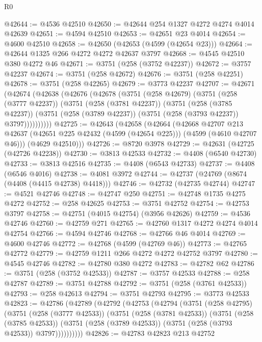 \begin{lexlean}{R0}
\begin{coremodule}
@42644 := @4536 @42510
@42650 := @42644 @254 @1327 @4272 @4274 @4014 @42639
@42651 := @4594 @42510
@42653 := @42651 @23 @4014
@42654 := @4600 @42510
@42658 := @42650 (@42653 (@4599 (@42654 @23)))
@42664 := @42644 @1325 @266 @4272 @4272 @42637 @3797
@42668 := @4545 @42510 @380 @4272 @46
@42671 := @3751 (@258 (@3752 @42237))
@42672 := @3757 @42237
@42674 := @3751 (@258 @42672)
@42676 := @3751 (@258 @42251)
@42678 := @3751 (@258 @42265)
@42679 := @3773 @42237
@42707 := @42671
    (@42674
      (@42638
        (@42676
          (@42678
            (@3751
              (@258 @42679)
              (@3751
                (@258 (@3777 @42237))
                (@3751
                  (@258 (@3781 @42237))
                  (@3751
                    (@258 (@3785 @42237))
                    (@3751 (@258 (@3789 @42237)) (@3751 (@258 (@3793 @42237)) @3797))))))))))
@42725 := @42643
    (@42658
      (@42664
        (@42668
          @42707
          @213
          @42637
          (@42651 @225 @42432 (@4599 (@42654 @225)))
          (@4599 (@4610 @42707 @46)))
        (@4629 @42510)))
@42726 := @8720 @3978
@42729 := @42631 (@42725 (@42726 @42238))
@42730 := @3813 @42533
@42732 := @4408 (@6540 @42730)
@42733 := @3813 @42516
@42735 := @4408 (@6543 @42733)
@42737 := @4408 (@6546 @4016)
@42738 := @4081 @3972
@42744 := @42737 (@24769 (@8674 (@4408 (@4415 @42738) @4418)))
@42746 := @42732 (@42735 @42744)
@42747 := @4521 @42746
@42748 := @42747 @250
@42751 := @42748 @1735 @4275 @4272
@42752 := @258 @42625
@42753 := @3751 @42752
@42754 := @42753 @3797
@42758 := @42751 (@4015 @42754) (@3956 @42626)
@42759 := @4536 @42746
@42760 := @42759 @271
@42765 := @42760 @1317 @4272 @4274 @4014 @42754
@42766 := @4594 @42746
@42768 := @42766 @46 @4014
@42769 := @4600 @42746
@42772 := @42768 (@4599 (@42769 @46))
@42773 := @42765 @42772
@42779 := @42759 @1211 @266 @4272 @4272 @42752 @3797
@42780 := @4545 @42746
@42782 := @42780 @380 @4272
@42783 := @42782 @62
@42786 := @3751 (@258 (@3752 @42533))
@42787 := @3757 @42533
@42788 := @258 @42787
@42789 := @3751 @42788
@42792 := @3751 (@258 (@3761 @42533))
@42793 := @258 @42613
@42794 := @3751 @42793
@42795 := @3773 @42533
@42823 := @42786
    (@42789
      (@42792
        (@42753
          (@42794
            (@3751
              (@258 @42795)
              (@3751
                (@258 (@3777 @42533))
                (@3751
                  (@258 (@3781 @42533))
                  (@3751
                    (@258 (@3785 @42533))
                    (@3751 (@258 (@3789 @42533)) (@3751 (@258 (@3793 @42533)) @3797))))))))))
@42826 := @42783 @42823 @213 @42752

\end{coremodule}
\end{lexlean}

